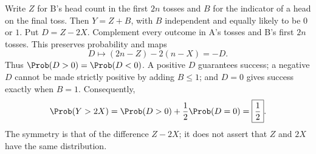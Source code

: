 Write $Z$ for B's head count in the first $2n$ tosses and $B$ for the indicator of a head on the final toss. Then $Y=Z+B$, with $B$ independent and equally likely to be $0$ or $1$. Put $D=Z-2X$. Complement every outcome in A's tosses and B's first $2n$ tosses. This preserves probability and maps
\[
D\longmapsto(2n-Z)-2(n-X)=-D.
\]
Thus $\Prob(D>0)=\Prob(D<0)$. A positive $D$ guarantees success; a negative $D$ cannot be made strictly positive by adding $B\le1$; and $D=0$ gives success exactly when $B=1$. Consequently,
\[
\Prob(Y>2X)=\Prob(D>0)+\frac12\Prob(D=0)
=\boxed{\frac12}.
\]
The symmetry is that of the difference $Z-2X$; it does not assert that $Z$ and $2X$ have the same distribution.
